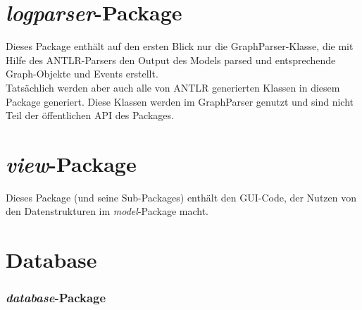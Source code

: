 \documentclass[accentcolor=tud0b,12pt,paper=a4]{tudreport}
\begin{document}
	\chapter{\textit{logparser}-Package}
	\label{logparser}
	Dieses Package enthält auf den ersten Blick nur die GraphParser-Klasse, die mit Hilfe des ANTLR-Parsers den Output des Models parsed und entsprechende Graph-Objekte und Events erstellt.\\
	Tatsächlich werden aber auch alle von ANTLR generierten Klassen in diesem Package generiert. Diese Klassen werden im GraphParser genutzt und sind nicht Teil der öffentlichen API des Packages.
		
	\chapter{\textit{view}-Package}
	Dieses Package (und seine Sub-Packages) enthält den GUI-Code, der Nutzen von den Datenstrukturen im \textit{model}-Package macht.
	
	\chapter{Database}
	\label{database}
		\subsection{\textit{database}-Package}
	
\end{document}
